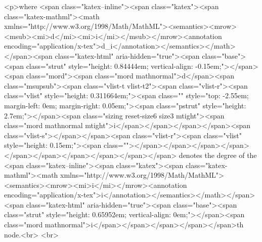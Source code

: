 <p>where <span class="katex--inline"><span class="katex"><span class="katex-mathml"><math xmlns="http://www.w3.org/1998/Math/MathML"><semantics><mrow><msub><mi>d</mi><mi>i</mi></msub></mrow><annotation encoding="application/x-tex">d_i</annotation></semantics></math></span><span class="katex-html" aria-hidden="true"><span class="base"><span class="strut" style="height: 0.84444em; vertical-align: -0.15em;"></span><span class="mord"><span class="mord mathnormal">d</span><span class="msupsub"><span class="vlist-t vlist-t2"><span class="vlist-r"><span class="vlist" style="height: 0.311664em;"><span class="" style="top: -2.55em; margin-left: 0em; margin-right: 0.05em;"><span class="pstrut" style="height: 2.7em;"></span><span class="sizing reset-size6 size3 mtight"><span class="mord mathnormal mtight">i</span></span></span></span><span class="vlist-s">​</span></span><span class="vlist-r"><span class="vlist" style="height: 0.15em;"><span class=""></span></span></span></span></span></span></span></span></span></span> denotes the degree of the <span class="katex--inline"><span class="katex"><span class="katex-mathml"><math xmlns="http://www.w3.org/1998/Math/MathML"><semantics><mrow><mi>i</mi></mrow><annotation encoding="application/x-tex">i</annotation></semantics></math></span><span class="katex-html" aria-hidden="true"><span class="base"><span class="strut" style="height: 0.65952em; vertical-align: 0em;"></span><span class="mord mathnormal">i</span></span></span></span></span>th node.<br>
\newline<br>
